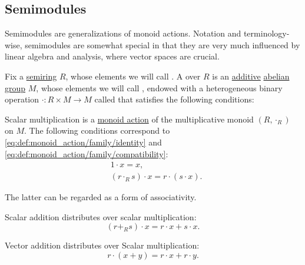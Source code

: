 \subsection{Semimodules}\label{subsec:semimodules}

Semimodules are generalizations of monoid actions. Notation and terminology-wise, semimodules are somewhat special in that they are very much influenced by linear algebra and analysis, where vector spaces are crucial.

\begin{definition}\label{def:semimodule}
  Fix a \hyperref[def:semiring]{semiring} \( R \), whose elements we will call . A  over \( R \) is an \hyperref[rem:additive_magma]{additive} \hyperref[def:abelian_group]{abelian group} \( M \), whose elements we will call , endowed with a heterogeneous binary operation \( \cdot: R \times M \to M \) called  that satisfies the following conditions:
  \begin{thmenum}
     Scalar multiplication is a \hyperref[def:monoid_action]{monoid action} of the multiplicative monoid \( (R, \cdot_R) \) on \( M \). The following conditions correspond to \eqref{eq:def:monoid_action/family/identity} and \eqref{eq:def:monoid_action/family/compatibility}:
    \begin{align}
      &1 \cdot x = x, \label{eq:def:semimodule/scalar_multiplication_action/identity} \\
      &(r \cdot_R s) \cdot x = r \cdot (s \cdot x). \label{eq:def:semimodule/scalar_multiplication_action/compatibility}
    \end{align}

    The latter can be regarded as a form of associativity.

     Scalar addition distributes over scalar multiplication:
    \begin{equation}\label{eq:def:semimodule/scalar_addition_distributivity}
      (r +_R s) \cdot x = r \cdot x + s \cdot x.
    \end{equation}

     Vector addition distributes over Scalar multiplication:
    \begin{equation}\label{eq:def:semimodule/vector_addition_distributivity}
      r \cdot (x + y) = r \cdot x + r \cdot y.
    \end{equation}


\end{thmenum}
\end{definition}

